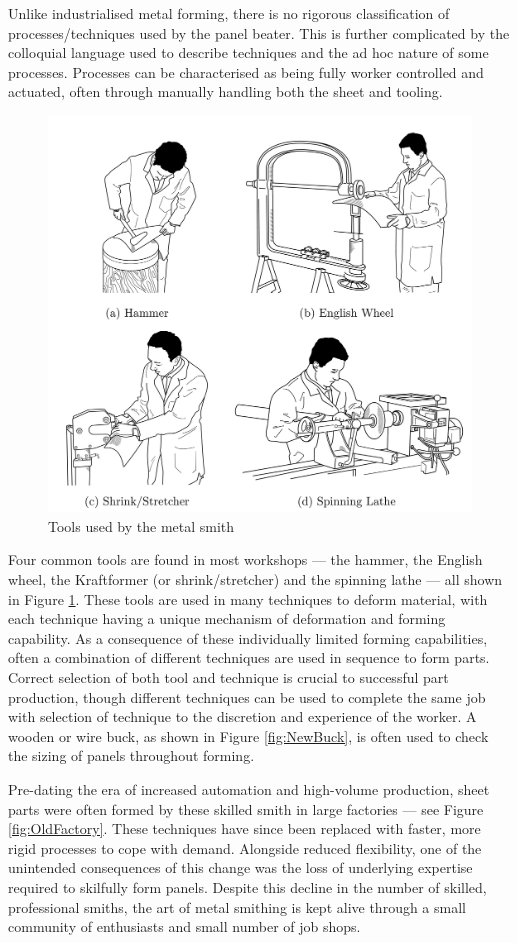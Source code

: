 Unlike industrialised metal forming, there is no rigorous classification of processes/techniques used by the panel beater. This is further complicated by the colloquial language used to describe techniques and the ad hoc nature of some processes. Processes can be characterised as being fully worker controlled and actuated, often through manually handling both the sheet and tooling.

\begin{figure}[h]
    \centering
    \includegraphics[width=0.8\linewidth]{Diagrams/Drawings.pdf}
    \caption{Tools used by the metal smith}
    \label{fig:Drawings}
\end{figure}

Four common tools are found in most workshops --- the hammer, the English wheel, the Kraftformer (or shrink/stretcher) and the spinning lathe --- all shown in Figure \ref{fig:Drawings}. These tools are used in many techniques to deform material, with each technique having a unique mechanism of deformation and forming capability. As a consequence of these individually limited forming capabilities, often a combination of different techniques are used in sequence to form parts. Correct selection of both tool and technique is crucial to successful part production, though different techniques can be used to complete the same job with selection of technique to the discretion and experience of the worker. A wooden or wire buck, as shown in Figure \ref{fig:NewBuck}, is often used to check the sizing of panels throughout forming.

Pre-dating the era of increased automation and high-volume production, sheet parts were often formed by these skilled smith in large factories --- see Figure \ref{fig:OldFactory}. These techniques have since been replaced with faster, more rigid processes to cope with demand. Alongside reduced flexibility, one of the unintended consequences of this change was the loss of underlying expertise required to skilfully form panels. Despite this decline in the number of skilled, professional smiths, the art of metal smithing is kept alive through a small community of enthusiasts and small number of job shops. 

